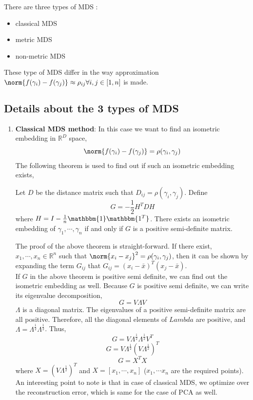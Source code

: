 There are three types of MDS : 
\begin{itemize}
\item classical MDS
\item metric MDS
\item non-metric MDS
\end{itemize}
These type of MDS differ in the way approximation  $\norm{f(\gamma_i) - f(\gamma_j)} \approx \rho_{ij} \forall i,j \in [1,n]$ is made.\\
\subsection{Details about the 3 types of MDS}
\begin{enumerate}
    \item \textbf{Classical MDS method}: In this case we want to find an isometric embedding in $\mathbb{R}^D$ space,
    $$\norm{f(\gamma_i)- f(\gamma_j)} = \rho(\gamma_i,\gamma_j)$$
    The following theorem is used to find out if such  an isometric embedding exists,
\begin{theorem}
Let $D$ be the distance matrix such that $D_{ij}= \rho(\gamma_i, \gamma_j)$. Define $$G= -\frac{1}{2}H^TDH$$
where $H = I-\frac{1}{n}\mathbbm{1}\mathbbm{1^T}$. There exists an isometric embedding of $\gamma_1, \cdots, \gamma_n$ if and only if $G$ is a positive semi-definite matrix.
\end{theorem} 
The proof of the above theorem is straight-forward. If there exist, $x_1, \cdots, x_n \in \mathbb{R}^n$ such that $\norm{x_i - x_j}^2 = \rho(\gamma_i, \gamma_j)$, then it can be shown by expanding the term $G_{ij}$ that $G_{ij}= (x_i-\bar{x})^T(x_j- \bar{x})$.\\
If $G$ in the above theorem is positive semi definite, we can find out the isometric embedding as well. Because $G$ is positive semi definite, we can write its eigenvalue decomposition,
$$G = V\Lambda V$$
$\Lambda$ is a diagonal matrix. The eigenvalues of a positive semi-definite matrix are all positive. Therefore, all the diagonal elements of $Lambda$ are positive, and $\Lambda = \Lambda^{\frac{1}{2}}\Lambda^{\frac{1}{2}}$. Thus,
$$G = V\Lambda^{\frac{1}{2}}\Lambda^{\frac{1}{2}}V^T$$
$$G = V\Lambda^{\frac{1}{2}}(V\Lambda^{\frac{1}{2}})^T$$
$$G = X^TX$$
where $X = (V\Lambda^{\frac{1}{2}})^T$ and $X = [x_1, \cdots, x_n]$ ($x_1, \cdots x_n$ are the required points). \\
An interesting point to note is that in case of classical MDS, we optimize over the reconstruction error, which is same for the case of PCA as well.\\

\end{enumerate}
